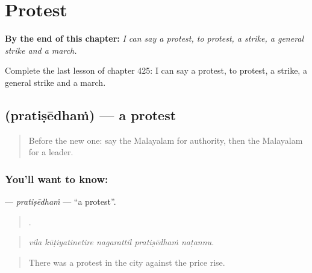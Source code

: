 
\chapter{Protest}
\label{ch:ml-protest}

\begin{chapteropening}
\textbf{By the end of this chapter:} \emph{I can say a protest, to protest, a strike, a general strike and a march.}

Complete the last lesson of chapter 425: I can say a protest, to protest, a strike, a general strike and a march.
\end{chapteropening}

\section[\texorpdfstring{\ml{പ്രതിഷേധം} (pratiṣēdhaṁ)}{പ്രതിഷേധം (pratiṣēdhaṁ)}]{ (pratiṣēdhaṁ) — a protest}

\label{lesson:ML-C425-pratisedham}



\begin{quote}
Before the new one: say the Malayalam for authority, then the Malayalam for a leader.
\end{quote}

\subsection*{You'll want to know: }
\textbf{} — \emph{pratiṣēdhaṁ} — \textquotedblleft{}a protest\textquotedblright{}.

\begin{quote}
    .
\end{quote}

\begin{quote}
\emph{vila kūṭiyatinetire nagarattil pratiṣēdhaṁ naṭannu.}
\end{quote}

\begin{quote}
There was a protest in the city against the price rise.
\end{quote}

